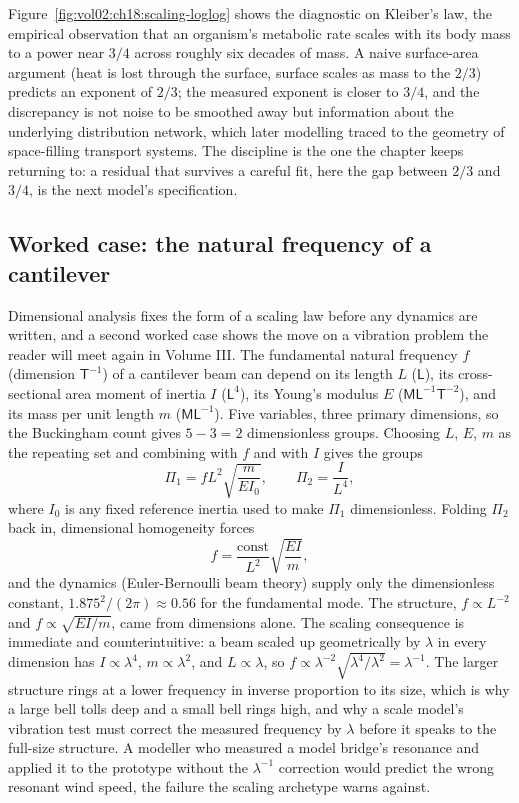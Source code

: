 

Figure~\ref{fig:vol02:ch18:scaling-loglog} shows the diagnostic on
Kleiber's law, the empirical observation that an organism's metabolic
rate scales with its body mass to a power near $3/4$ across roughly six
decades of mass. A naive surface-area argument (heat is lost through the
surface, surface scales as mass to the $2/3$) predicts an exponent of
$2/3$; the measured exponent is closer to $3/4$, and the discrepancy is
not noise to be smoothed away but information about the underlying
distribution network, which later modelling traced to the geometry of
space-filling transport systems. The discipline is the one the chapter
keeps returning to: a residual that survives a careful fit, here the gap
between $2/3$ and $3/4$, is the next model's specification.

\subsection{Worked case: the natural frequency of a cantilever}

Dimensional analysis fixes the form of a scaling law before any dynamics
are written, and a second worked case shows the move on a vibration
problem the reader will meet again in Volume III. The fundamental natural
frequency $f$ (dimension $\mathsf{T}^{-1}$) of a cantilever beam can
depend on its length $L$ ($\mathsf{L}$), its cross-sectional area moment
of inertia $I$ ($\mathsf{L}^4$), its Young's modulus $E$
($\mathsf{M}\mathsf{L}^{-1}\mathsf{T}^{-2}$), and its mass per unit length
$m$ ($\mathsf{M}\mathsf{L}^{-1}$). Five variables, three primary
dimensions, so the Buckingham count gives $5 - 3 = 2$ dimensionless
groups. Choosing $L$, $E$, $m$ as the repeating set and combining with $f$
and with $I$ gives the groups
\[
\Pi_1 = f L^2 \sqrt{\frac{m}{E I_0}}, \qquad \Pi_2 = \frac{I}{L^4},
\]
where $I_0$ is any fixed reference inertia used to make $\Pi_1$
dimensionless. Folding $\Pi_2$ back in, dimensional homogeneity forces
\[
f = \frac{\text{const}}{L^2}\sqrt{\frac{E I}{m}},
\]
and the dynamics (Euler-Bernoulli beam theory) supply only the
dimensionless constant, $1.875^2/(2\pi) \approx 0.56$ for the fundamental
mode. The structure, $f \propto L^{-2}$ and $f \propto \sqrt{EI/m}$, came
from dimensions alone. The scaling consequence is immediate and
counterintuitive: a beam scaled up geometrically by $\lambda$ in every
dimension has $I \propto \lambda^4$, $m \propto \lambda^2$, and
$L \propto \lambda$, so $f \propto \lambda^{-2}\sqrt{\lambda^4/\lambda^2} =
\lambda^{-1}$. The larger structure rings at a lower frequency in inverse
proportion to its size, which is why a large bell tolls deep and a small
bell rings high, and why a scale model's vibration test must correct the
measured frequency by $\lambda$ before it speaks to the full-size
structure. A modeller who measured a model bridge's resonance and applied
it to the prototype without the $\lambda^{-1}$ correction would predict
the wrong resonant wind speed, the failure the scaling archetype warns
against.

